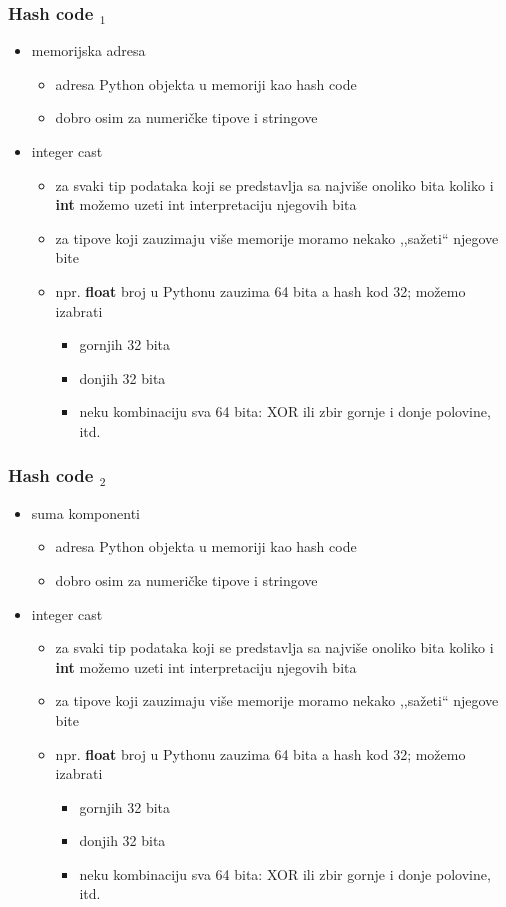 \documentclass[compress]{beamer}
\begin{document}
\begin{frame}[fragile]
  \frametitle{Hash code $_1$}
  \begin{itemize}
    \item memorijska adresa
    \begin{itemize}
      \item adresa Python objekta u memoriji kao hash code
      \item dobro osim za numeričke tipove i stringove
    \end{itemize}
    \item integer cast 
    \begin{itemize}
      \item za svaki tip podataka koji se predstavlja sa najviše onoliko bita koliko i \textbf{int} možemo uzeti int interpretaciju njegovih bita
      \item za tipove koji zauzimaju više memorije moramo nekako ,,sažeti`` njegove bite
      \item npr. \textbf{float} broj u Pythonu zauzima 64 bita a hash kod 32; možemo izabrati
      \begin{itemize}
        \item gornjih 32 bita
        \item donjih 32 bita
        \item neku kombinaciju sva 64 bita: XOR ili zbir gornje i donje polovine, itd.
      \end{itemize}
    \end{itemize}
  \end{itemize}
\end{frame}

\begin{frame}[fragile]
  \frametitle{Hash code $_2$}
  \begin{itemize}
    \item suma komponenti
    \begin{itemize}
      \item adresa Python objekta u memoriji kao hash code
      \item dobro osim za numeričke tipove i stringove
    \end{itemize}
    \item integer cast 
    \begin{itemize}
      \item za svaki tip podataka koji se predstavlja sa najviše onoliko bita koliko i \textbf{int} možemo uzeti int interpretaciju njegovih bita
      \item za tipove koji zauzimaju više memorije moramo nekako ,,sažeti`` njegove bite
      \item npr. \textbf{float} broj u Pythonu zauzima 64 bita a hash kod 32; možemo izabrati
      \begin{itemize}
        \item gornjih 32 bita
        \item donjih 32 bita
        \item neku kombinaciju sva 64 bita: XOR ili zbir gornje i donje polovine, itd.
      \end{itemize}
    \end{itemize}
  \end{itemize}
\end{frame}
\end{document}
